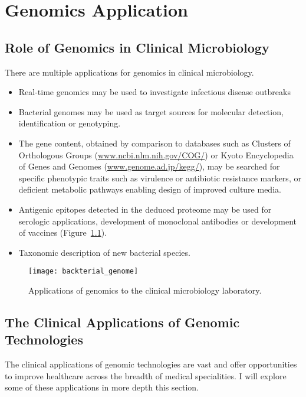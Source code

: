 \chapter{Genomics Application}\label{ch:ch3}

\section{Role of Genomics in Clinical Microbiology} 
There are multiple applications for genomics in clinical
microbiology\cite{ray2003}. 
\begin{itemize}
	\item  Real-time genomics may be used to investigate infectious disease outbreaks
	\item  Bacterial genomes may be used as target sources for molecular detection, identification or genotyping.
	\item The gene content, obtained by comparison to databases such as Clusters of Orthologous Groups (\url{www.ncbi.nlm.nih.gov/COG/}) or Kyoto Encyclopedia of Genes and Genomes (\url{www.genome.ad.jp/kegg/}), may be searched for specific phenotypic traits such as virulence or antibiotic resistance markers, or deficient metabolic pathways enabling design of improved culture media.
	
	\item Antigenic epitopes detected in the deduced proteome may be
	used for serologic applications, development of monoclonal
	antibodies or development of vaccines (Figure~\ref{fig:genome}).
	\item Taxonomic description of new bacterial species.
\end{itemize}

\begin{figure}
	\centering
	\texttt{[image: backterial\_genome]}
	\caption{Applications of genomics to the clinical microbiology laboratory.}
	\label{fig:genome}
\end{figure} 


\section{The Clinical Applications of Genomic Technologies}
The clinical applications of genomic technologies are vast and offer opportunities to improve healthcare across the breadth of medical specialities. I will explore some of these applications in more depth this section.

